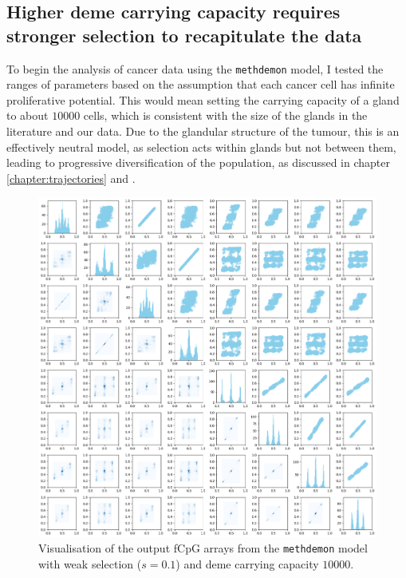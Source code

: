 \subsection{Higher deme carrying capacity requires stronger selection to
recapitulate the data}
To begin the analysis of cancer data using the \texttt{methdemon} model, I tested the
ranges of parameters based on the assumption that each cancer cell has infinite
proliferative potential. This would mean setting the carrying capacity of a gland
to about $10000$ cells, which is consistent with the size of the glands in the
literature \cite{sottoriva_big_2015} and our data. Due to the glandular
structure of the tumour, this is an effectively neutral model, as selection
acts within glands but not between them, leading to progressive diversification
of the population, as discussed in chapter \ref{chapter:trajectories} and
\cite{noble_spatial_2022}.\par

\begin{figure}[h]
    \centering
    \includegraphics[width=\textwidth]{Chapter_5/figures/10000plot.png}
    \caption{Visualisation of the output fCpG arrays from the \texttt{methdemon}
    model with weak selection ($s=0.1$) and deme carrying capacity $10000$.}
    \label{fig:methdemon_weak_selection}
\end{figure}

